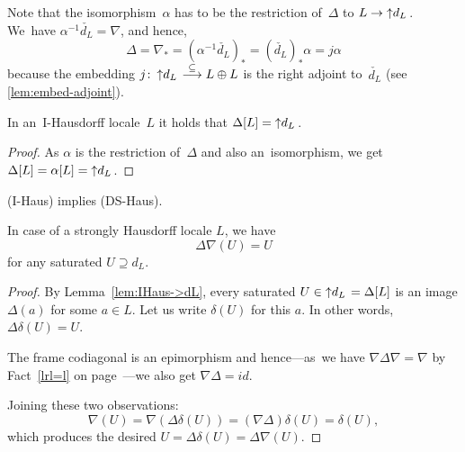 Note that the isomorphism~$\alpha$ has to be the restriction of~$\Delta$ to $L
\to \left\uparrow d_L \right.$.
We~have $\alpha^{-1} \check{d_L} = \nabla$, and hence,
\[
\Delta
= \nabla_*
= (\alpha^{-1} \check{d_L})_*
= (\check{d_L})_* \alpha
= j \alpha
\]
because the embedding $j\colon \dL \embed L \oplus L$ is the right adjoint
to~$\check{d_L}$ (see \ref{lem:embed-adjoint}).

\begin{lem} \label{lem:IHaus->dL}
  In an~I-Hausdorff locale~$L$ it holds that $\Delta[L] = \left\uparrow d_L \right.$.
\end{lem}
\begin{proof}
  As $\alpha$ is the restriction of~$\Delta$ and also an~isomorphism, we get
  $\Delta[L] = \alpha[L] = \left\uparrow d_L \right.$.
\end{proof}

\begin{thm} \label{IHaus->DSHaus}
  (I-Haus) implies (DS-Haus).
\end{thm}

\begin{lem} \label{lem:delta-nabla=id}
  In case of a strongly Hausdorff locale $L$, we have
  \[
    \Delta\nabla(U) = U
  \]
  for any saturated $U \supseteq d_L$.
\end{lem}
\begin{proof}
  By Lemma~\ref{lem:IHaus->dL}, every saturated $U\in \left\uparrow d_L \right. = \Delta[L]$ is an
  image $\Delta(a)$ for some $a\in L$.
  Let us write $\delta(U)$ for this $a$.
  In other words, $\Delta\delta(U) = U$.

  The frame codiagonal is an epimorphism and hence---as~we have $\nabla \Delta
  \nabla = \nabla$ by Fact~\ref{lrl=l} on page~\pageref{lrl=l}---we also get
  $\nabla \Delta = id$.

  Joining these two observations:
  \[
    \nabla (U) = \nabla (\Delta\delta (U)) = (\nabla \Delta)\delta (U) =
    \delta(U),
  \]
  which produces the desired $U = \Delta \delta (U) = \Delta \nabla (U)$.
\end{proof}

